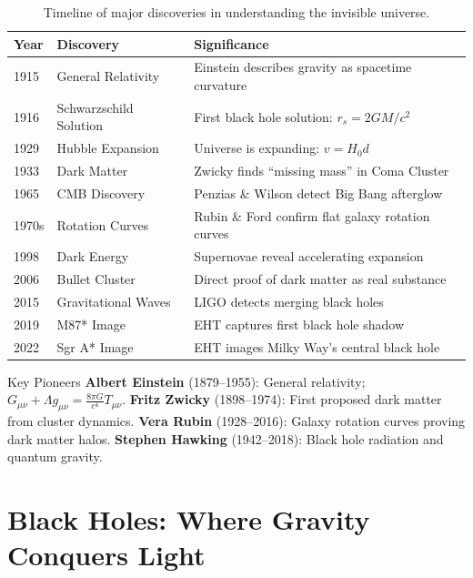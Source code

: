 \documentclass[11pt,a4paper]{article}
\begin{document}
\begin{table}[H]
\centering
\caption{Timeline of major discoveries in understanding the invisible universe.}
\label{tab:history_timeline}
\small
\begin{tabular}{|l|l|p{9cm}|}
\hline
\textbf{Year} & \textbf{Discovery} & \textbf{Significance} \\
\hline
1915 & General Relativity & Einstein describes gravity as spacetime curvature \\
1916 & Schwarzschild Solution & First black hole solution: $r_s = 2GM/c^2$ \\
1929 & Hubble Expansion & Universe is expanding: $v = H_0 d$ \\
1933 & Dark Matter & Zwicky finds ``missing mass'' in Coma Cluster \\
1965 & CMB Discovery & Penzias \& Wilson detect Big Bang afterglow \\
1970s & Rotation Curves & Rubin \& Ford confirm flat galaxy rotation curves \\
1998 & Dark Energy & Supernovae reveal accelerating expansion \\
2006 & Bullet Cluster & Direct proof of dark matter as real substance \\
2015 & Gravitational Waves & LIGO detects merging black holes \\
2019 & M87* Image & EHT captures first black hole shadow \\
2022 & Sgr A* Image & EHT images Milky Way's central black hole \\
\hline
\end{tabular}
\end{table}

\begin{scientistbox}{Key Pioneers}
\textbf{Albert Einstein} (1879--1955): General relativity; $G_{\mu\nu} + \Lambda g_{\mu\nu} = \frac{8\pi G}{c^4} T_{\mu\nu}$. \textbf{Fritz Zwicky} (1898--1974): First proposed dark matter from cluster dynamics. \textbf{Vera Rubin} (1928--2016): Galaxy rotation curves proving dark matter halos. \textbf{Stephen Hawking} (1942--2018): Black hole radiation and quantum gravity.
\end{scientistbox}

\newpage

\section{Black Holes: Where Gravity Conquers Light}
\label{sec:blackholes}
\end{document}
